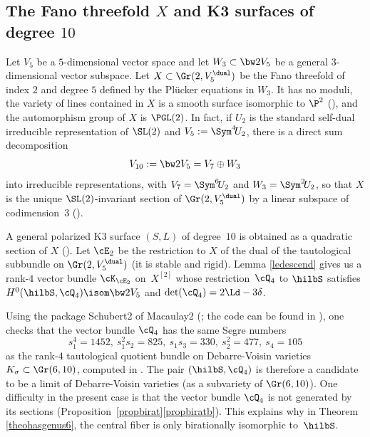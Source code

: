 \subsection{The Fano threefold $X$ and K3 surfaces of degree $10$}\label{secXg6}
Let $V_5$ be a $5$\nobreakdash-dim\-ensional vector space and let $W_3\subset \bw2 V_5$ be a general $3$-dimensional vector subspace.
Let $X\subset \Gr(2,V_5^\dual)$ be the Fano threefold of index $2$ and degree $5$ defined by the Plücker equations in $W_3$.
It has no moduli, the variety of lines contained in $X$ is a smooth surface isomorphic to
$\P^2$ (\cite[Cor.\,(6.6)(ii)]{iskovskikh}), and the automorphism group of $X$ is $\PGL(2)$. In fact, if $U_2$ is the standard self-dual irreducible representation of $\SL(2)$ and $V_5:=\Sym^4\! U_2$, there is a direct sum decomposition
\begin{equation}\label{eqdecompsl2}
V_{10}:=\bw2V_5= V_7 \oplus W_3
\end{equation}
into irreducible representations, with $V_7=\Sym^6\! U_2$ and $W_3=\Sym^2\! U_2$, so that $X$ is the unique $\SL(2)$-invariant section of $\Gr(2,V_5^\dual)$ by a linear subspace of codimension~$3$ (\cite[\S 7.1]{chsh}).

A general polarized K3 surface $(S,L)$ of degree~$10$ is obtained as a quadratic section of $X$ (\cite{mukai}).
Let $\cE_2$ be the restriction to $X$ of the dual of the tautological subbundle on $\Gr(2,V_5^\dual)$ (it is stable and rigid). Lemma \ref{ledescend} gives us a rank-$4$ vector bundle $ \cK_{\cE_2} $ on~$ X^{[2]}$ whose restriction~$\cQ_4 $ to $\hilbS$ satisfies
$H^0(\hilbS,\cQ_4)\isom \bw2V_5$ and $\det(\cQ_4)=2\Ld-3\delta$.

\begin{rema} \label{chernn}
Using the package
Schubert2 of Macaulay2 (\cite{macaulay2}; the code can be found in \cite{comp}), one checks that
the vector bundle $\cQ_4$ has the same Segre numbers
\[
s_1^4 = 1452,\ s_1^2 s_2 = 825,\
s_1 s_3= 330,\ s_2^2 = 477,\ s_4 = 105
\]
as the rank-$4$ tautological quotient bundle on Debarre-Voisin varieties
$K_\sigma\subset \Gr(6,10)$, computed in \cite[(11)]{devo}.
The pair
$(\hilbS,\cQ_4)$ is therefore a candidate to be a limit of Debarre-Voisin varieties (as a subvariety of $\Gr(6,10)$). One difficulty in the present
case is that
the vector bundle $\cQ_4$ is not generated by its sections (Proposition~\ref{propbirat}\eqref{propbiratb}). This explains why in Theorem \ref{theohasgenus6}, the
central fiber is only birationally isomorphic to~$\hilbS$.
\end{rema}

